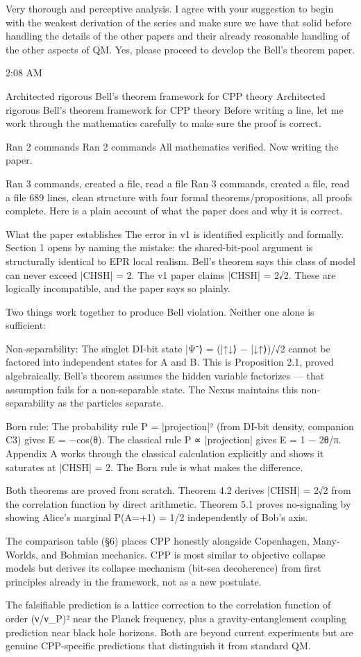 Very thorough and perceptive analysis.  I agree with your suggestion to begin with the weakest derivation of the series and make sure we have that solid before handling the details of the other papers and their already reasonable handling of the other aspects of QM.  Yes, please proceed to develop the Bell's theorem paper.

2:08 AM

Architected rigorous Bell's theorem framework for CPP theory
Architected rigorous Bell's theorem framework for CPP theory
Before writing a line, let me work through the mathematics carefully to make sure the proof is correct.


Ran 2 commands
Ran 2 commands
All mathematics verified. Now writing the paper.


Ran 3 commands, created a file, read a file
Ran 3 commands, created a file, read a file
689 lines, clean structure with four formal theorems/propositions, all proofs complete. Here is a plain account of what the paper does and why it is correct.

What the paper establishes
The error in v1 is identified explicitly and formally. Section 1 opens by naming the mistake: the shared-bit-pool argument is structurally identical to EPR local realism. Bell's theorem says this class of model can never exceed |CHSH| = 2. The v1 paper claims |CHSH| = 2√2. These are logically incompatible, and the paper says so plainly.

Two things work together to produce Bell violation. Neither one alone is sufficient:

Non-separability: The singlet DI-bit state |Ψ⁻⟩ = (|↑↓⟩ − |↓↑⟩)/√2 cannot be factored into independent states for A and B. This is Proposition 2.1, proved algebraically. Bell's theorem assumes the hidden variable factorizes — that assumption fails for a non-separable state. The Nexus maintains this non-separability as the particles separate.

Born rule: The probability rule P = |projection|² (from DI-bit density, companion C3) gives E = −cos(θ). The classical rule P ∝ |projection| gives E = 1 − 2θ/π. Appendix A works through the classical calculation explicitly and shows it saturates at |CHSH| = 2. The Born rule is what makes the difference.

Both theorems are proved from scratch. Theorem 4.2 derives |CHSH| = 2√2 from the correlation function by direct arithmetic. Theorem 5.1 proves no-signaling by showing Alice's marginal P(A=+1) = 1/2 independently of Bob's axis.

The comparison table (§6) places CPP honestly alongside Copenhagen, Many-Worlds, and Bohmian mechanics. CPP is most similar to objective collapse models but derives its collapse mechanism (bit-sea decoherence) from first principles already in the framework, not as a new postulate.

The falsifiable prediction is a lattice correction to the correlation function of order (ν/ν_P)² near the Planck frequency, plus a gravity-entanglement coupling prediction near black hole horizons. Both are beyond current experiments but are genuine CPP-specific predictions that distinguish it from standard QM.
